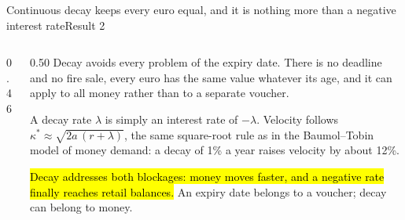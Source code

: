 \documentclass[aspectratio=169,9pt]{beamer}
\begin{document}
\begin{frame}{Continuous decay keeps every euro equal, and it is nothing more than a negative interest rate}{Result 2}
  \begin{columns}[c]
    \begin{column}{0.46\textwidth}
    \end{column}
    \begin{column}{0.50\textwidth}
      \small
      Decay avoids every problem of the expiry date. There is no deadline and no fire sale, every euro has the same value whatever its age, and it can apply to all money rather than to a separate voucher.

      \vspace{0.6em}
      A decay rate $\lambda$ is simply an interest rate of $-\lambda$. Velocity follows $\kappa^* \approx \sqrt{2a\,(r+\lambda)}$, the same square-root rule as in the Baumol--Tobin model of money demand: a decay of 1\% a year raises velocity by about 12\%.

      \vspace{0.6em}
      \hl{Decay addresses both blockages: money moves faster, and a negative rate finally reaches retail balances.} An expiry date belongs to a voucher; decay can belong to money.
    \end{column}
  \end{columns}
\end{frame}
\end{document}
